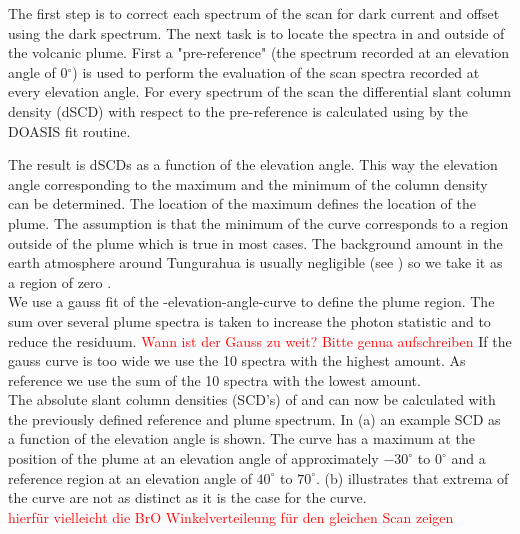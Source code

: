 %
The first step is to correct each spectrum of the scan for dark current and offset using the dark spectrum.
The next task is to locate the spectra in and outside of the volcanic plume.
First a "pre-reference" (the spectrum recorded at an elevation angle of  0$^{\circ} $) is used to perform the evaluation of the scan spectra recorded at every elevation angle.
For every spectrum of the scan the  differential slant column density (dSCD) with respect to the pre-reference is calculated using  by the DOASIS fit routine.

The result is  dSCDs as a function of the elevation angle. This way the elevation angle corresponding to the maximum and the minimum of the  column density can be determined. The location of the  maximum defines the location of the plume. The assumption is that the minimum of the  curve corresponds to a region outside of the plume which is true in most cases. The background  amount in the earth atmosphere around Tungurahua is usually negligible (see  ) so we take it as a region of zero . \\
We use a gauss fit of the -elevation-angle-curve to define the plume region.
The sum over several plume spectra is taken to increase the photon statistic and to reduce the residuum. \textcolor{red}{Wann ist der Gauss zu weit? Bitte genua aufschreiben} If the gauss curve is too wide  we use the 10 spectra with the highest  amount. As reference we use the sum of the 10 spectra with the lowest  amount.\\
%
The absolute slant column densities (SCD's) of   and  can now be calculated with the previously defined reference and plume spectrum.
In  (a) an example  SCD as a function of the elevation angle is shown. The  curve has a maximum at the position of the plume at an elevation angle of approximately $-30^{\circ}$ to $0^{\circ}$  and a reference region at an elevation angle of $40^{\circ}$ to $70^{\circ}$.  (b)  illustrates that  extrema of the   curve are not as distinct as it is the case for the  curve.\\
\textcolor{red}{hierfür vielleicht die BrO Winkelverteileung für den gleichen Scan zeigen}\\
